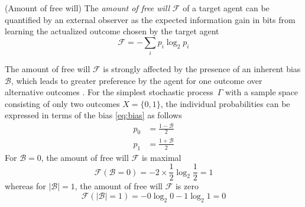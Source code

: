 \documentclass{ws-ijmpb}
\begin{document}
\begin{definition}
(Amount of free will) The \emph{amount of free will} $\mathscr{F}$
of a target agent can be quantified by an external observer as the
expected information gain in bits from learning the actualized outcome
chosen by the target agent \cite{Georgiev2021}
\begin{equation}
\mathscr{F}=-\sum_{i}p_{i}\log_{2}p_{i}\label{eq:freewill}
\end{equation}
\end{definition}

The amount of free will $\mathscr{F}$ is strongly affected by the
presence of an inherent bias $\mathscr{B}$, which leads to greater
preference by the agent for one outcome over alternative outcomes
\cite{Georgiev2021}. For the simplest stochastic process~$\Gamma$
with a sample space consisting of only two outcomes $X=\{0,1\}$,
the individual probabilities can be expressed in terms of the bias
\eqref{eq:bias} as follows
\begin{align}
p_{0} & =\frac{1-\mathscr{B}}{2}\\
p_{1} & =\frac{1+\mathscr{B}}{2}
\end{align}
For $\mathscr{B}=0$, the amount of free will $\mathscr{F}$ is maximal
\begin{equation}
\mathscr{F}\left(\mathscr{B}=0\right)=-2\times\frac{1}{2}\log_{2}\frac{1}{2}=1
\end{equation}
whereas for $\left|\mathscr{B}\right|=1$, the amount of free will
$\mathscr{F}$ is zero
\begin{equation}
\mathscr{F}\left(\left|\mathscr{B}\right|=1\right)=-0\log_{2}0-1\log_{2}1=0
\end{equation}
\end{document}
